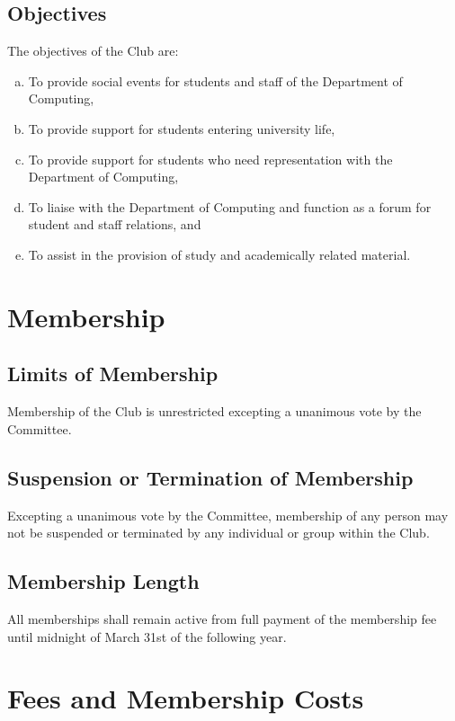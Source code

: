 \documentclass[a4paper,12pt]{article}
\begin{document}
\subsection{Objectives}

The objectives of the Club are:

\begin{enumerate}[a)]
	\item To provide social events for students and staff of the Department of Computing,
	\item To provide support for students entering university life,
	\item To provide support for students who need representation with the Department of Computing,
	\item To liaise with the Department of Computing and function as a forum for student and staff relations, and
	\item To assist in the provision of study and academically related material.
\end{enumerate}

\section{Membership}

\subsection{Limits of Membership}

Membership of the Club is unrestricted excepting a unanimous vote by the Committee.

\subsection{Suspension or Termination of Membership}

Excepting a unanimous vote by the Committee, membership of any person may not be suspended or terminated by any individual or group within the Club.

\subsection{Membership Length}

All memberships shall remain active from full payment of the membership fee until midnight of March 31st of the following year.

\section{Fees and Membership Costs}
\end{document}
